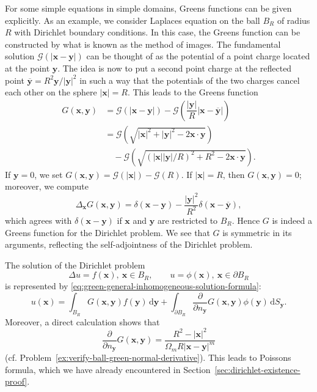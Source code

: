 For some simple equations in simple domains, Green\textquotesingle s functions can be given explicitly. As an example, we consider Laplace\textquotesingle s equation on the ball $B_R$ of radius $R$ with Dirichlet boundary conditions. In this case, the Green\textquotesingle s function can be constructed by what is known as the method of images. The fundamental solution $\mathcal{G}(|\bm{x}-\bm{y}|)$ can be thought of as the potential of a point charge located at the point $\bm{y}$. The idea is now to put a second point charge at the reflected point $\overline{\bm{y}}=R^2\bm{y}/|\bm{y}|^2$ in such a way that the potentials of the two charges cancel each other on the sphere $|\bm{x}|=R$. This leads to the Green\textquotesingle s function
\begin{equation}\label{eq:ball-dirichlet-green-image-formula}
\begin{aligned}
G(\bm{x},\bm{y})&=\mathcal{G}(|\bm{x}-\bm{y}|)-\mathcal{G}\left(\dfrac{|\bm{y}|}R|\bm{x}-\overline{\bm{y}}|\right)\\
&=\mathcal{G}\left(\sqrt{|\bm{x}|^2+|\bm{y}|^2-2\bm{x}\cdot\bm{y}}\right)\\
&\quad-\mathcal{G}\left(\sqrt{(|\bm{x}||\bm{y}|/R)^2+R^2-2\bm{x}\cdot\bm{y}}\right).
\end{aligned}
\end{equation}
If $\bm{y}=0$, we set $G(\bm{x},\bm{y})=\mathcal{G}(|\bm{x}|)-\mathcal{G}(R)$. If $|\bm{x}|=R$, then $G(\bm{x},\bm{y})=0$; moreover, we compute
\begin{equation}\label{eq:ball-green-image-laplacian}
\Delta_{\bm{x}}G(\bm{x},\bm{y})=\delta(\bm{x}-\bm{y})-\dfrac{|\bm{y}|^2}{R^2}\delta(\bm{x}-\overline{\bm{y}}),
\end{equation}
which agrees with $\delta(\bm{x}-\bm{y})$ if $\bm{x}$ and $\bm{y}$ are restricted to $B_R$. Hence $G$ is indeed a Green\textquotesingle s function for the Dirichlet problem. We see that $G$ is symmetric in its arguments, reflecting the self-adjointness of the Dirichlet problem.

The solution of the Dirichlet problem
\begin{equation}\label{eq:ball-dirichlet-poisson-boundary-problem}
\Delta u=f(\bm{x}),\ \bm{x}\in B_R,\qquad u=\phi(\bm{x}),\ \bm{x}\in\partial B_R
\end{equation}
is represented by \eqref{eq:green-general-inhomogeneous-solution-formula}:
\begin{equation}\label{eq:ball-dirichlet-green-solution-representation}
u(\bm{x})=\int_{B_R}G(\bm{x},\bm{y})f(\bm{y})\,\mathrm{d}\bm{y}+\int_{\partial B_R}\dfrac{\partial}{\partial n_{\bm{y}}}G(\bm{x},\bm{y})\phi(\bm{y})\,\mathrm{d}S_{\bm{y}}.
\end{equation}
Moreover, a direct calculation shows that
\begin{equation}\label{eq:ball-green-boundary-normal-derivative}
\dfrac{\partial}{\partial n_{\bm{y}}}G(\bm{x},\bm{y})=\dfrac{R^2-|\bm{x}|^2}{\Omega_m R|\bm{x}-\bm{y}|^m}
\end{equation}
(cf. Problem~\ref{ex:verify-ball-green-normal-derivative}). This leads to Poisson\textquotesingle s formula, which we have already encountered in Section~\ref{sec:dirichlet-existence-proof}.
